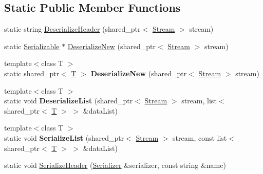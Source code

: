 \subsection*{Static Public Member Functions}
\begin{DoxyCompactItemize}
\item 
static string \hyperlink{class_gost_crypt_1_1_serializable_a7f36a9d2ec09e05dee375b802fa13ab1}{Deserialize\+Header} (shared\+\_\+ptr$<$ \hyperlink{class_gost_crypt_1_1_stream}{Stream} $>$ stream)
\item 
static \hyperlink{class_gost_crypt_1_1_serializable}{Serializable} $\ast$ \hyperlink{class_gost_crypt_1_1_serializable_a2a1a45654e086d8b894d027bb781627a}{Deserialize\+New} (shared\+\_\+ptr$<$ \hyperlink{class_gost_crypt_1_1_stream}{Stream} $>$ stream)
\item 
\mbox{\label{class_gost_crypt_1_1_serializable_a2a49042b4bc28f0e83dda746fbc49da3}} 
{\footnotesize template$<$class T $>$ }\\static shared\+\_\+ptr$<$ \hyperlink{_stribog_8c_aba2f4c400d7a4c0bf0296be622087314}{T} $>$ {\bfseries Deserialize\+New} (shared\+\_\+ptr$<$ \hyperlink{class_gost_crypt_1_1_stream}{Stream} $>$ stream)
\item 
\mbox{\label{class_gost_crypt_1_1_serializable_abe7223b009bab2b7537191e153bb03ee}} 
{\footnotesize template$<$class T $>$ }\\static void {\bfseries Deserialize\+List} (shared\+\_\+ptr$<$ \hyperlink{class_gost_crypt_1_1_stream}{Stream} $>$ stream, list$<$ shared\+\_\+ptr$<$ \hyperlink{_stribog_8c_aba2f4c400d7a4c0bf0296be622087314}{T} $>$ $>$ \&data\+List)
\item 
\mbox{\label{class_gost_crypt_1_1_serializable_ab1e531dba17476da959bdbc53ef4b137}} 
{\footnotesize template$<$class T $>$ }\\static void {\bfseries Serialize\+List} (shared\+\_\+ptr$<$ \hyperlink{class_gost_crypt_1_1_stream}{Stream} $>$ stream, const list$<$ shared\+\_\+ptr$<$ \hyperlink{_stribog_8c_aba2f4c400d7a4c0bf0296be622087314}{T} $>$ $>$ \&data\+List)
\item 
static void \hyperlink{class_gost_crypt_1_1_serializable_a6228b7fc3bb16947ea6b39aa3f20aca1}{Serialize\+Header} (\hyperlink{class_gost_crypt_1_1_serializer}{Serializer} \&serializer, const string \&name)
\end{DoxyCompactItemize}


